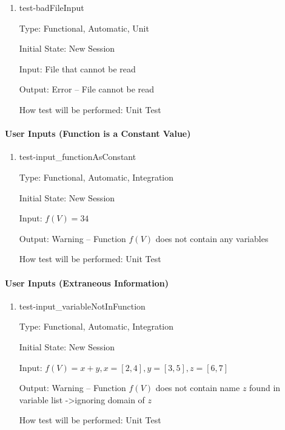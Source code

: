\documentclass[12pt, titlepage]{article}
\begin{document}
\begin{enumerate}
	
	\item{test-badFileInput}
	
	Type: Functional, Automatic, Unit
	
	Initial State: New Session
	
	Input: File that cannot be read
	
	Output: Error -- File cannot be read
	
	How test will be performed: Unit Test\\
\end{enumerate}
	
\paragraph{User Inputs (Function is a Constant Value)}

\begin{enumerate}	
	\item{test-input\_functionAsConstant}
	
	Type: Functional, Automatic, Integration
	
	Initial State: New Session
	
	Input: $f(V) = 34$
	
	Output: Warning -- Function $f(V)$ does not contain any variables
	
	How test will be performed: Unit Test\\
\end{enumerate}
	
\paragraph{User Inputs (Extraneous Information)}
	
\begin{enumerate}
	\item{test-input\_variableNotInFunction}
	
	Type: Functional, Automatic, Integration
	
	Initial State: New Session
	
	Input: $f(V) = x + y, x = [2,4], y = [3,5], z = [6,7]$
	
	Output: Warning -- Function $f(V)$ does not contain name $z$ found in 
	variable list -\textgreater ignoring domain of $z$
	
	How test will be performed: Unit Test\\
	
\end{enumerate}
		
\end{document}
